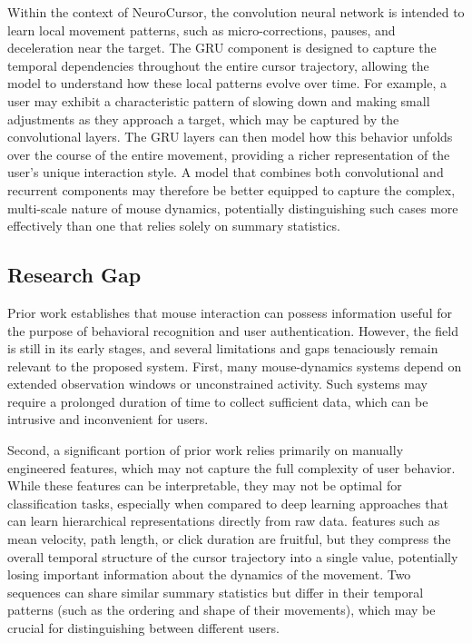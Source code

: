 \documentclass[conference]{IEEEtran}
\begin{document}
Within the context of NeuroCursor, the convolution neural network is intended to learn local movement patterns, such as micro-corrections, pauses, and deceleration near the target. The GRU component is designed to capture the temporal dependencies throughout the entire cursor trajectory, allowing the model to understand how these local patterns evolve over time. For example, a user may exhibit a characteristic pattern of slowing down and making small adjustments as they approach a target, which may be captured by the convolutional layers. The GRU layers can then model how this behavior unfolds over the course of the entire movement, providing a richer representation of the user's unique interaction style. A model that combines both convolutional and recurrent components may therefore be better equipped to capture the complex, multi-scale nature of mouse dynamics, potentially distinguishing such cases more effectively than one that relies solely on summary statistics. 

\subsection{Research Gap}

Prior work establishes that mouse interaction can possess information useful for the purpose of behavioral recognition and user authentication. However, the field is still in its early stages, and several limitations and gaps tenaciously remain relevant to the proposed system. First, many mouse-dynamics systems depend on extended observation windows or unconstrained activity. Such systems may require a prolonged duration of time to collect sufficient data, which can be intrusive and inconvenient for users. 

Second, a significant portion of prior work relies primarily on manually engineered features, which may not capture the full complexity of user behavior. While these features can be interpretable, they may not be optimal for classification tasks, especially when compared to deep learning approaches that can learn hierarchical representations directly from raw data. features such as mean velocity, path length, or click duration are fruitful, but they compress the overall temporal structure of the cursor trajectory into a single value, potentially losing important information about the dynamics of the movement. Two sequences can share similar summary statistics but differ in their temporal patterns (such as the ordering and shape of their movements), which may be crucial for distinguishing between different users.
\end{document}
